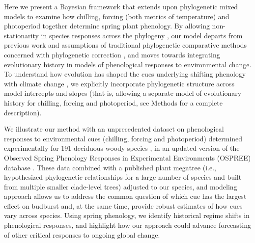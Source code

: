 \documentclass[11pt]{article}
\begin{document}
\par Here we present a Bayesian framework that extends upon phylogenetic mixed models \citep{housworth2004phylogenetic} to examine how chilling, forcing (both metrics of temperature) and photoperiod together determine spring plant phenology. By allowing non-stationarity in species responses across the phylogeny \citep{davies2019phylogenetically}, our model departs from previous work and assumptions of traditional phylogenetic comparative methods concerned with phylogenetic correction \citep[e.g.,][]{freckleton2002phylogenetic}, and moves towards integrating evolutionary history in models of phenological responses to environmental change. To understand how evolution has shaped the cues underlying shifting phenology with climate change \citep{uyeda2017evolution}, we explicitly incorporate phylogenetic structure across model intercepts and slopes (that is, allowing a separate model of evolutionary history for chilling, forcing and photoperiod, see Methods for a complete description). 

\par We illustrate our method with an unprecedented dataset on phenological responses to environmental cues (chilling, forcing and photoperiod) determined experimentally for 191 deciduous woody species \cite[by far the most studied group of species in phenology experiments, see][]{ettinger2020}, in an updated version of the Observed Spring Phenology Responses in Experimental Environments (OSPREE) database \citep{wolkovich2019}. These data combined with a published plant megatree \citep{smith2018constructing} (i.e., hypothesized phylogenetic relationships for a large number of species and built from multiple smaller clade-level trees) adjusted to our species, and modeling approach allows us to address the common question of which cue has the largest effect on budburst and, at the same time, provide robust estimates of how cues vary across species. Using spring phenology, we identify historical regime shifts \citep{uyeda2017evolution} in phenological responses, and highlight how our approach could advance forecasting of other critical responses to ongoing global change.



\end{document}
